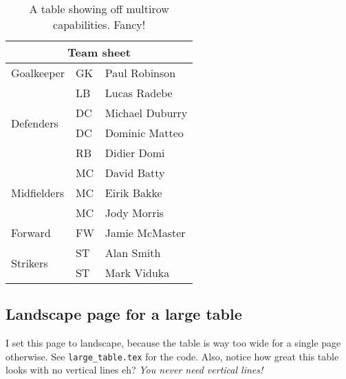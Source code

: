 \documentclass[../main]{subfiles}
\begin{document}
\begin{table}[htbp]
\centering
    \begin{tabular}{lll}
    \toprule
    \multicolumn{3}{c}{Team sheet} \\
    \midrule
    Goalkeeper & GK & Paul Robinson \\ \midrule
    \multirow{4}{*}{Defenders} & LB & Lucas Radebe \\
     & DC & Michael Duburry \\
     & DC & Dominic Matteo \\
     & RB & Didier Domi \\ \midrule
    \multirow{3}{*}{Midfielders} & MC & David Batty \\
     & MC & Eirik Bakke \\
     & MC & Jody Morris \\ \midrule
    Forward & FW & Jamie McMaster \\ \midrule
    \multirow{2}{*}{Strikers} & ST & Alan Smith \\
     & ST & Mark Viduka \\
    \bottomrule
    \end{tabular}
\caption{A table showing off multirow capabilities. Fancy!}
\label{tab:multirow}
\end{table}

\newpage
\begin{landscape}
\subsection{Landscape page for a large table}
I set this page to landscape, because the table is way too wide for a single page otherwise. See \texttt{large\_table.tex} for the code. Also, notice how great this table looks with no vertical lines eh? \emph{You never need vertical lines!}

\end{landscape}

\pagestyle{fancy}
\end{document}
